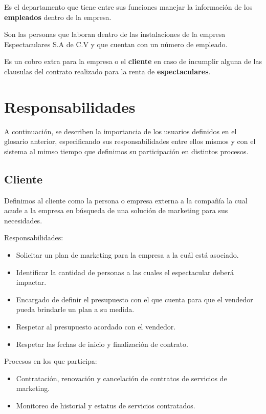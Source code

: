 \begin{description}[style=nextline]
\item[Capital Humano]
Es el departamento que tiene entre sus funciones manejar la información de los \textbf{empleados} dentro de la empresa.

\item[Empleado]
Son las personas que laboran dentro de las instalaciones de la empresa Espectaculares S.A de C.V y que cuentan con un número de empleado.

\item[Penalización]
Es un cobro extra para la empresa o el \textbf{cliente} en caso de incumplir alguna de las clausulas del contrato realizado para la renta de \textbf{espectaculares}.

\end{description}

\newpage

\section{Responsabilidades}

A continuación, se describen la importancia de los usuarios definidos en el glosario anterior, especificando sus responsabilidades entre ellos mismos y con el sistema al mimso tiempo que definimos su participación en distintos procesos.

\begin{Usuario}{\subsection{Cliente}}{
   Definimos al cliente como la persona o empresa externa a la compañía la cual acude a la empresa en búsqueda de una solución de marketing para sus necesidades.
}
    \item[Responsabilidades:]\cdtEmpty 
   \begin{itemize}
       \item Solicitar un plan de marketing para la empresa a la cuál está asociado.
       \item Identificar la cantidad de personas a las cuales el espectacular deberá impactar.
       \item Encargado de definir el presupuesto con el que cuenta para que el vendedor pueda brindarle un plan a su medida.
       \item Respetar al presupuesto acordado con el vendedor.
	   \item Respetar las fechas de inicio y finalización de contrato.
   \end{itemize}
	\item[Procesos en los que participa:] \cdtEmpty
    \begin{itemize}
		\item Contratación, renovación y cancelación de contratos de servicios de marketing.
	    \item Monitoreo de historial y estatus de servicios contratados.
    \end{itemize}
\end{Usuario}

